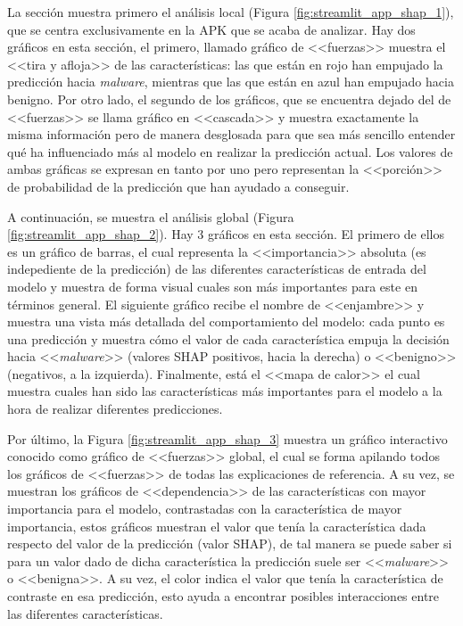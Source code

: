 La sección muestra primero el análisis local (Figura \ref{fig:streamlit_app_shap_1}), que se centra exclusivamente en la APK que se acaba de analizar. Hay dos gráficos en esta sección, el primero, llamado gráfico de <<fuerzas>> muestra el <<tira y afloja>> de las características: las que están en rojo han empujado la predicción hacia \textit{malware}, mientras que las que están en azul han empujado hacia benigno. Por otro lado, el segundo de los gráficos, que se encuentra dejado del de <<fuerzas>> se llama gráfico en <<cascada>> y muestra exactamente la misma información pero de manera desglosada para que sea más sencillo entender qué ha influenciado más al modelo en realizar la predicción actual. Los valores de ambas gráficas se expresan en tanto por uno pero representan la <<porción>> de probabilidad de la predicción que han ayudado a conseguir.


A continuación, se muestra el análisis global (Figura \ref{fig:streamlit_app_shap_2}). Hay 3 gráficos en esta sección. El primero de ellos es un gráfico de barras, el cual representa la <<importancia>> absoluta (es indepediente de la predicción) de las diferentes características de entrada del modelo y muestra de forma visual cuales son más importantes para este en términos general. El siguiente gráfico recibe el nombre de <<enjambre>> y muestra una vista más detallada del comportamiento del modelo: cada punto es una predicción y muestra cómo el valor de cada  característica empuja la decisión hacia <<\textit{malware}>> (valores SHAP positivos, hacia la derecha) o <<benigno>> (negativos, a la izquierda). Finalmente, está el <<mapa de calor>> el cual muestra cuales han sido las características más importantes para el modelo a la hora de realizar diferentes predicciones.


Por último, la Figura \ref{fig:streamlit_app_shap_3} muestra un gráfico interactivo conocido como gráfico de <<fuerzas>> global, el cual se forma apilando todos los gráficos de <<fuerzas>> de todas las explicaciones de referencia. A su vez, se muestran los gráficos de <<dependencia>> de las características con mayor importancia para el modelo, contrastadas con la característica de mayor importancia, estos gráficos muestran el valor que tenía la característica dada respecto del valor de la predicción (valor SHAP), de tal manera se puede saber si para un valor dado de dicha característica la predicción suele ser <<\textit{malware}>> o <<benigna>>. A su vez, el color indica el valor que tenía la característica de contraste en esa predicción, esto ayuda a encontrar posibles interacciones entre las diferentes características.

